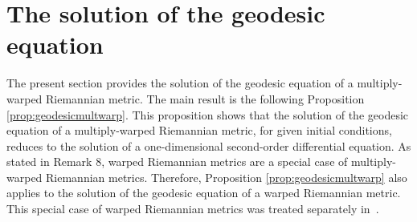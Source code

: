 \documentclass{svmult}
\begin{document}


\section{The solution of the geodesic equation} \label{sec:geodesic}
The present section provides the solution of the geodesic equation of a multiply-warped Riemannian metric. The main result is the following Proposition \ref{prop:geodesicmultwarp}. This proposition shows that the solution of the geodesic equation of a multiply-warped Riemannian metric, for given initial conditions, reduces to the solution of a one-dimensional second-order differential equation. As stated in Remark 8, warped Riemannian metrics are a special case of multiply-warped Riemannian metrics. Therefore, Proposition \ref{prop:geodesicmultwarp} also applies to the solution of the geodesic equation of a warped Riemannian metric. This special case of warped Riemannian metrics was treated separately in~\cite{oneil}.
\end{document}
